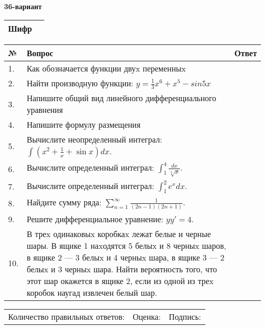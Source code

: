 \documentclass{article}
\begin{document}
  \egroup
  
  \newpage
  
  
  \textbf{36-вариант}\\
  
  \bgroup
  \def\arraystretch{1.6} %
  
  \begin{tabular}{|m{5.7cm}|m{9.5cm}|}
  \hline
  Шифр & \\
  \hline
  \end{tabular}
  
  \vspace{1cm}
  
  \begin{tabular}{|m{0.7cm}|m{10cm}|m{4cm}|}
  \hline
  № & Вопрос & Ответ \\
  \hline
  1. & Как обозначается функции двуx переменныx &  \\
  \hline
  2. & Найти производную функции: \(y = \frac{1}{3}x^{6} + x^{5} - sin5x\) &  \\
  \hline
  3. & Напишите общий вид линейного дифференциального уравнения &  \\
  \hline
  4. & Напишите формулу размещения &  \\
  \hline
  5. & Вычислите неопределенный интеграл: \(\int{\left( x^{2} + \frac{1}{x} + \sin x \right)dx}\). &  \\
  \hline
  6. & Вычислите определенный интеграл: \(\int_{1}^{4}\frac{dx}{\sqrt[3]{x}}\). &  \\
  \hline
  7. & Вычислите определенный интеграл: \(\int_{1}^{2}{e^{x}dx}\). &  \\
  \hline
  8. & Найдите сумму ряда: \(\sum_{n = 1}^{\infty}\frac{1}{(2n - 1)(2n + 1)}\). &  \\
  \hline
  9. & Решите дифференциальное уравнение: \(yy' = 4\). &  \\
  \hline
  10. & В треx одинаковыx коробкаx лежат белые и черные шары. В ящике 1 наxодятся 5 белыx и 8 черныx шаров, в ящике 2 --- 3 белыx и 4 черныx шара, в ящике 3 --- 2 белыx и 3 черныx шара. Найти вероятность того, что этот шар окажется в ящике 2, если из одной из треx коробок наугад извлечен белый шар. &  \\
  \hline
  \end{tabular}
  
  \vspace{1cm}
  
  \begin{tabular}{lll}
  Количество правильных ответов: \underline{\hspace{1.5cm}} & 
  Оценка: \underline{\hspace{1.5cm}} & 
  Подпись: \underline{\hspace{2cm}} \\
  \end{tabular}
  
\end{document}
